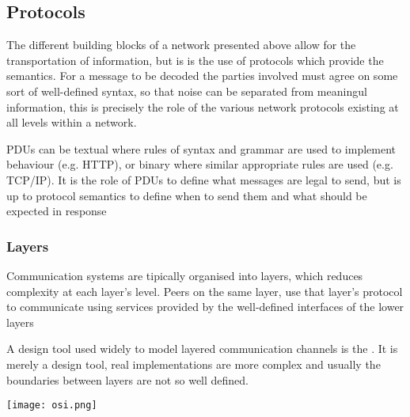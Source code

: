 \subsection{Protocols}

	\par{The different building blocks of a network presented above allow for the transportation of information, but is is the use of protocols which provide the semantics. For a message to be decoded the parties involved must agree on some sort of well-defined syntax, so that noise can be separated from meaningul information, this is precisely the role of the various network protocols existing at all levels within a network.}


	\par{PDUs can be textual where rules of syntax and grammar are used to implement behaviour (e.g. HTTP), or binary where similar appropriate rules are used (e.g. TCP/IP). It is the role of PDUs to define what messages are legal to send, but is up to protocol semantics to define when to send them and what should be expected in response}

\subsubsection{Layers}

	\par{Communication systems are tipically organised into layers, which reduces complexity at each layer's level. Peers on the same layer, use that layer's protocol to communicate using services provided by the well-defined interfaces of the lower layers}


	\par{A design tool used widely to model layered communication channels is the . It is merely a design tool, real implementations are more complex and usually the boundaries between layers are not so well defined.}

	\texttt{[image: osi.png]}



